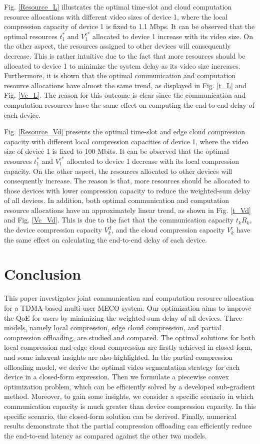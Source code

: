 \documentclass[journal,draftcls,onecolumn,12pt,twoside]{IEEEtran}
\begin{document}
Fig. \ref{Resource_L} illustrates the optimal time-slot and cloud computation resource allocations with different video sizes of device 1, where the local compression capacity of device 1 is fixed to 1.1     Mbps. It can be observed that the optimal resources $t_1^*$ and $V_1^{\text{c}*}$ allocated to device 1 increase with its video size. On the other aspect, the resources assigned to other devices will consequently decrease. This is rather intuitive due to the fact that more resources should be allocated to device 1 to minimize the system delay as its video size increases. Furthermore, it is shown that the optimal communication and computation resource allocations have almost the same trend, as displayed in Fig. \ref{t_L} and Fig. \ref{Vc_L}. The reason for this outcome is clear since the communication and computation resources have the same effect on computing the end-to-end delay of each device.

Fig. \ref{Resource_Vd} presents the optimal time-slot and edge cloud compression capacity with different local compression capacities of device 1, where the video size of device 1 is fixed to 100 Mbits. It can be observed that the optimal resources $t_1^*$ and $V_1^{\text{c}*}$ allocated to device 1 decrease with its local compression capacity. On the other aspect, the resources allocated to other devices will consequently increase. The reason is that, more resources should be allocated to those devices with lower compression capacity to reduce the weighted-sum delay of all devices. In addition, both optimal communication and computation resource allocations have an approximately linear trend, as shown in Fig. \ref{t_Vd} and Fig. \ref{Vc_Vd}. This is due to the fact that the communication capacity $t_kR_k$, the device compression capacity $V_k^{\text{d}}$, and the cloud compression capacity $V_k^{\text{c}}$ have the same effect on calculating the end-to-end delay of each device.

\section{Conclusion}
This paper investigates joint communication and computation resource allocation for a TDMA-based multi-user MECO system. Our optimization aims to improve the QoE for users by minimizing the weighted-sum delay of all devices. Three models, namely local compression, edge cloud compression, and partial compression offloading, are studied and compared. The optimal solutions for both local compression and edge cloud compression are firstly achieved in closed-form, and some inherent insights are also highlighted. In the partial compression offloading model, we derive the optimal video segmentation strategy for each device in a closed-form expression. Then we formulate a piecewise convex optimization problem, which can be efficiently solved by a developed sub-gradient method. Moreover, to gain some insights, we consider a specific scenario in which communication capacity is much greater than device compression capacity. In this specific scenario, the closed-form solution can be derived. Finally, numerical results demonstrate that the partial compression offloading can efficiently reduce the end-to-end latency as compared against the other two models.
\end{document}
